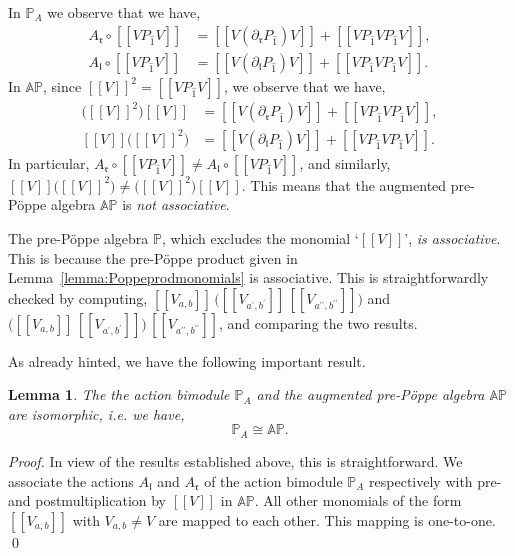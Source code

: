 \documentclass[5p,twocolumn]{elsarticle}
\newcommand*{\pa}{{\partial}}
\newcommand*{\lb}{[\![}
\newcommand*{\rb}{]\!]}
\newcommand*{\el}{\mathfrak l}
\newcommand*{\rl}{\mathfrak r}
\newtheorem{lemma}[theorem]{Lemma}
\begin{document}
\begin{example}\label{ex:nonassoc}
  In $\mathbb{P}_A$ we observe that we have,
  \begin{align*}
    A_{\rl}\circ\lb VP_{\hat{1}}V\rb&=\lb V(\pa_{\rl}P_{\hat{1}})V\rb+\lb VP_{\hat{1}}VP_{\hat{1}}V\rb,\\
    A_{\el}\circ\lb VP_{\hat{1}}V\rb&=\lb V(\pa_{\el}P_{\hat{1}})V\rb+\lb VP_{\hat{1}}VP_{\hat{1}}V\rb.
  \end{align*}
  In $\mathbb{AP}$, since $\lb V\rb^2=\lb VP_{\hat 1}V\rb$, we observe that we have,
  \begin{align*}
    \bigl(\lb V\rb^2\bigr)\lb V\rb&=\lb V(\pa_{\rl}P_{\hat 1})V\rb+\lb VP_{\hat 1}VP_{\hat 1}V\rb,\\
    \lb V\rb\bigl(\lb V\rb^2\bigr)&=\lb V(\pa_{\el}P_{\hat 1})V\rb+\lb VP_{\hat 1}VP_{\hat 1}V\rb.   
  \end{align*}
  In particular, $A_{\rl}\circ\lb VP_{\hat{1}}V\rb\neq A_{\el}\circ\lb VP_{\hat{1}}V\rb$, and similarly, $\lb V\rb\bigl(\lb V\rb^2\bigr)\neq\bigl(\lb V\rb^2\bigr)\lb V\rb$.
  This means that the augmented pre-P\"oppe algebra $\mathbb{AP}$ is \emph{not associative}.
\end{example}
%
\begin{remark}
  The pre-P\"oppe algebra $\mathbb{P}$, which excludes the monomial `$\lb V\rb$', \emph{is associative}.
  This is because the pre-P\"oppe product given in Lemma~\ref{lemma:Poppeprodmonomials} is associative. 
  This is straightforwardly checked by computing, $\lb V_{a,b}\rb\,\bigl(\lb V_{a^\prime,b^\prime}\rb\,\lb V_{a^{\prime\prime},b^{\prime\prime}}\rb\bigr)$
  and $\bigl(\lb V_{a,b}\rb\,\lb V_{a^\prime,b^\prime}\rb\bigr)\,\lb V_{a^{\prime\prime},b^{\prime\prime}}\rb$, and comparing the two results. 
\end{remark}
%
As already hinted, we have the following important result.
%
\begin{lemma}\label{lemma:APandPAisomorphic}
  The the action bimodule $\mathbb{P}_A$ and the augmented pre-P\"oppe algebra $\mathbb{AP}$ are isomorphic, i.e.\/ we have,
\begin{equation*}
     \mathbb{P}_A\cong\mathbb{AP}.
\end{equation*}
\end{lemma}
%
\begin{proof}
  In view of the results established above, this is straightforward. We associate the actions $A_{\el}$ and $A_{\rl}$ of the action bimodule $\mathbb{P}_A$
  respectively with pre- and postmultiplication by $\lb V\rb$ in $\mathbb{AP}$. All other monomials of the form $\lb V_{a,b}\rb$ with $V_{a,b}\neq V$ are mapped to each other.
  This mapping is one-to-one. 
\qed
\end{proof}
\end{document}
